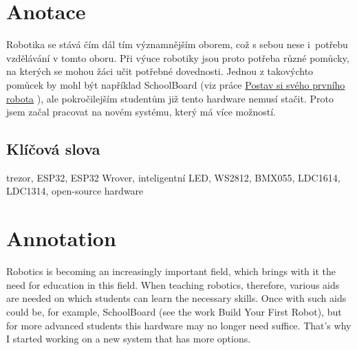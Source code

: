 \documentclass{template/socthesis}
\author{Tomáš Vavrinec} %
\begin{document}
\maketitle



\pagestyle{empty}

\section*{Anotace}
\color{black}

Robotika se stává čím dál tím významnějším oborem, což s sebou nese i~potřebu vzdělávání v tomto oboru.
Při výuce robotiky jsou proto potřeba různé pomůcky, na kterých se mohou žáci učit potřebné dovednosti. Jednou z takovýchto pomůcek 
by mohl být například SchoolBoard (viz práce \href{https://github.com/TVavrinec/SOC-text/blob/master/SOČ.pdf}{Postav si svého prvního robota} \parencite{soc2020}), 
ale pokročilejším studentům již tento hardware nemusí stačit. Proto jsem začal pracovat na novém systému, který má více možností.

\subsection*{Klíčová slova}

\color{black}

trezor, ESP32, ESP32 Wrover, inteligentní LED, WS2812, BMX055, LDC1614, LDC1314, open-source hardware

\newpage

\vspace{20mm}

\section*{Annotation}
\color{black}

Robotics is becoming an increasingly important field, which brings with it the need for education in this field.
When teaching robotics, therefore, various aids are needed on which students can learn the necessary skills. Once with such aids
could be, for example, SchoolBoard (see the work Build Your First Robot), but for more advanced students this hardware may no 
longer need suffice. That's why I started working on a new system that has more options.
\end{document}

